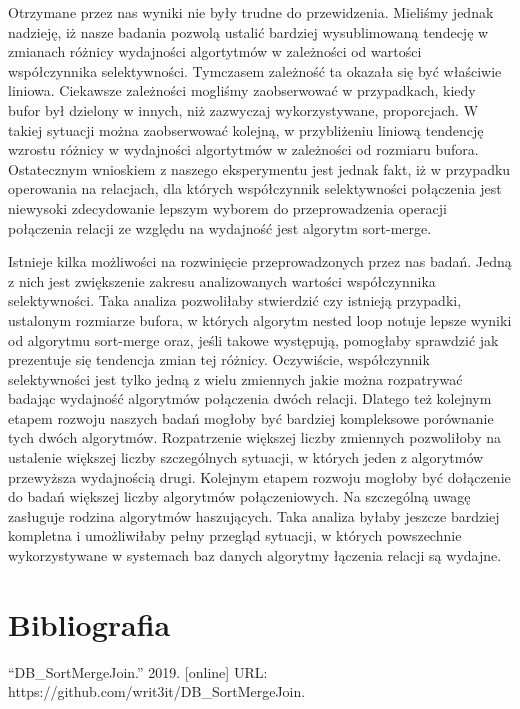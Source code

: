 \documentclass[]{article}
\begin{document}
Otrzymane przez nas wyniki nie były trudne do przewidzenia. Mieliśmy
jednak nadzieję, iż nasze badania pozwolą ustalić bardziej wysublimowaną
tendecję w zmianach różnicy wydajności algortytmów w zależności od
wartości współczynnika selektywności. Tymczasem zależność ta okazała się
być właściwie liniowa. Ciekawsze zależności mogliśmy zaobserwować w
przypadkach, kiedy bufor był dzielony w innych, niż zazwyczaj
wykorzystywane, proporcjach. W takiej sytuacji można zaobserwować
kolejną, w przybliżeniu liniową tendencję wzrostu różnicy w wydajności
algortytmów w zależności od rozmiaru bufora. Ostatecznym wnioskiem z
naszego eksperymentu jest jednak fakt, iż w przypadku operowania na
relacjach, dla których współczynnik selektywności połączenia jest
niewysoki zdecydowanie lepszym wyborem do przeprowadzenia operacji
połączenia relacji ze względu na wydajność jest algorytm sort-merge.
\vspace{2mm}

Istnieje kilka możliwości na rozwinięcie przeprowadzonych przez nas
badań. Jedną z nich jest zwiększenie zakresu analizowanych wartości
współczynnika selektywności. Taka analiza pozwoliłaby stwierdzić czy
istnieją przypadki, ustalonym rozmiarze bufora, w których algorytm
nested loop notuje lepsze wyniki od algorytmu sort-merge oraz, jeśli
takowe występują, pomogłaby sprawdzić jak prezentuje się tendencja zmian
tej różnicy. Oczywiście, współczynnik selektywności jest tylko jedną z
wielu zmiennych jakie można rozpatrywać badając wydajność algorytmów
połączenia dwóch relacji. Dlatego też kolejnym etapem rozwoju naszych
badań mogłoby być bardziej kompleksowe porównanie tych dwóch algorytmów.
Rozpatrzenie większej liczby zmiennych pozwoliłoby na ustalenie większej
liczby szczególnych sytuacji, w których jeden z algorytmów przewyższa
wydajnością drugi. Kolejnym etapem rozwoju mogłoby być dołączenie do
badań większej liczby algorytmów połączeniowych. Na szczególną uwagę
zasługuje rodzina algorytmów haszujących. Taka analiza byłaby jeszcze
bardziej kompletna i umożliwiłaby pełny przegląd sytuacji, w których
powszechnie wykorzystywane w systemach baz danych algorytmy łączenia
relacji są wydajne. \pagebreak

\section{Bibliografia}\label{bibliografia}



\hypertarget{refs}{}
\hypertarget{ref-GIT2019}{}
``DB\_SortMergeJoin.'' 2019. {[}online{]} URL:
https://github.com/writ3it/DB\_SortMergeJoin.
\end{document}
